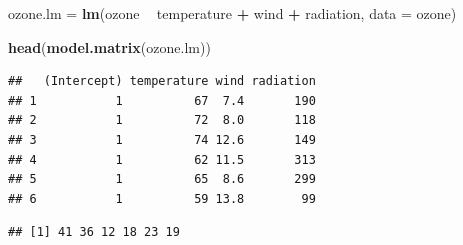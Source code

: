 \documentclass[10pt,ignorenonframetext,]{beamer}
\newenvironment{Shaded}{\begin{snugshade}}{\end{snugshade}}
\newcommand{\KeywordTok}[1]{\textcolor[rgb]{0.13,0.29,0.53}{\textbf{#1}}}
\newcommand{\DataTypeTok}[1]{\textcolor[rgb]{0.13,0.29,0.53}{#1}}
\newcommand{\StringTok}[1]{\textcolor[rgb]{0.31,0.60,0.02}{#1}}
\newcommand{\OperatorTok}[1]{\textcolor[rgb]{0.81,0.36,0.00}{\textbf{#1}}}
\newcommand{\NormalTok}[1]{#1}
\begin{document}
\begin{frame}[fragile]

\scriptsize

\begin{Shaded}
\begin{Highlighting}[]
\NormalTok{ozone.lm =}\StringTok{ }\KeywordTok{lm}\NormalTok{(ozone }\OperatorTok{~}\StringTok{ }\NormalTok{temperature }\OperatorTok{+}\StringTok{ }\NormalTok{wind }\OperatorTok{+}\StringTok{ }\NormalTok{radiation, }\DataTypeTok{data =}\NormalTok{ ozone)}
\end{Highlighting}
\end{Shaded}

\small

\begin{Shaded}
\begin{Highlighting}[]
\KeywordTok{head}\NormalTok{(}\KeywordTok{model.matrix}\NormalTok{(ozone.lm))}
\end{Highlighting}
\end{Shaded}

\begin{verbatim}
##   (Intercept) temperature wind radiation
## 1           1          67  7.4       190
## 2           1          72  8.0       118
## 3           1          74 12.6       149
## 4           1          62 11.5       313
## 5           1          65  8.6       299
## 6           1          59 13.8        99
\end{verbatim}

\begin{Shaded}
\end{Shaded}

\begin{verbatim}
## [1] 41 36 12 18 23 19
\end{verbatim}

\normalsize

\end{frame}
\end{document}
